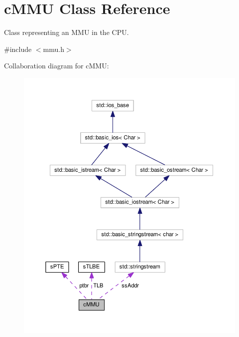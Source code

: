 \hypertarget{classcMMU}{\section{c\-M\-M\-U \-Class \-Reference}
\label{df/deb/classcMMU}
}


\-Class representing an \-M\-M\-U in the \-C\-P\-U.  




{\ttfamily \#include $<$mmu.\-h$>$}



\-Collaboration diagram for c\-M\-M\-U\-:
\nopagebreak
\begin{figure}[H]
\begin{center}
\leavevmode
\includegraphics[width=350pt]{dc/d5d/classcMMU__coll__graph}
\end{center}
\end{figure}
